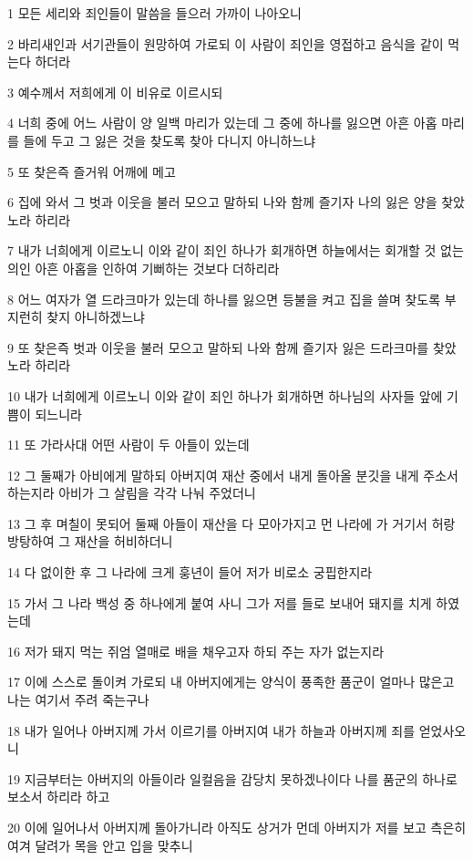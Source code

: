 \par 1 모든 세리와 죄인들이 말씀을 들으러 가까이 나아오니
\par 2 바리새인과 서기관들이 원망하여 가로되 이 사람이 죄인을 영접하고 음식을 같이 먹는다 하더라
\par 3 예수께서 저희에게 이 비유로 이르시되
\par 4 너희 중에 어느 사람이 양 일백 마리가 있는데 그 중에 하나를 잃으면 아흔 아홉 마리를 들에 두고 그 잃은 것을 찾도록 찾아 다니지 아니하느냐
\par 5 또 찾은즉 즐거워 어깨에 메고
\par 6 집에 와서 그 벗과 이웃을 불러 모으고 말하되 나와 함께 즐기자 나의 잃은 양을 찾았노라 하리라
\par 7 내가 너희에게 이르노니 이와 같이 죄인 하나가 회개하면 하늘에서는 회개할 것 없는 의인 아흔 아홉을 인하여 기뻐하는 것보다 더하리라
\par 8 어느 여자가 열 드라크마가 있는데 하나를 잃으면 등불을 켜고 집을 쓸며 찾도록 부지런히 찾지 아니하겠느냐
\par 9 또 찾은즉 벗과 이웃을 불러 모으고 말하되 나와 함께 즐기자 잃은 드라크마를 찾았노라 하리라
\par 10 내가 너희에게 이르노니 이와 같이 죄인 하나가 회개하면 하나님의 사자들 앞에 기쁨이 되느니라
\par 11 또 가라사대 어떤 사람이 두 아들이 있는데
\par 12 그 둘째가 아비에게 말하되 아버지여 재산 중에서 내게 돌아올 분깃을 내게 주소서 하는지라 아비가 그 살림을 각각 나눠 주었더니
\par 13 그 후 며칠이 못되어 둘째 아들이 재산을 다 모아가지고 먼 나라에 가 거기서 허랑방탕하여 그 재산을 허비하더니
\par 14 다 없이한 후 그 나라에 크게 훙년이 들어 저가 비로소 궁핍한지라
\par 15 가서 그 나라 백성 중 하나에게 붙여 사니 그가 저를 들로 보내어 돼지를 치게 하였는데
\par 16 저가 돼지 먹는 쥐엄 열매로 배을 채우고자 하되 주는 자가 없는지라
\par 17 이에 스스로 돌이켜 가로되 내 아버지에게는 양식이 풍족한 품군이 얼마나 많은고 나는 여기서 주려 죽는구나
\par 18 내가 일어나 아버지께 가서 이르기를 아버지여 내가 하늘과 아버지께 죄를 얻었사오니
\par 19 지금부터는 아버지의 아들이라 일컬음을 감당치 못하겠나이다 나를 품군의 하나로 보소서 하리라 하고
\par 20 이에 일어나서 아버지께 돌아가니라 아직도 상거가 먼데 아버지가 저를 보고 측은히 여겨 달려가 목을 안고 입을 맞추니
